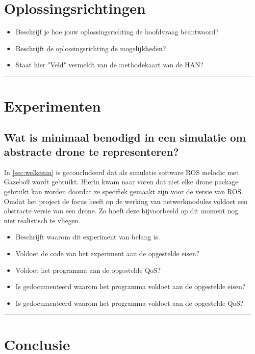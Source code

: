 \documentclass[a4paper, 11pt, oneside]{report}
\begin{document}
\chapter{Oplossingsrichtingen}

\begin{itemize}
\item Beschrijf je hoe jouw oplossingsrichting de hoofdvraag beantwoord?
\item Beschrijft de oplossingsrichting de mogelijkheden?
\item Staat hier "Veld" vermeldt van de methodekaart van de HAN?
\end{itemize}
\hrule

\chapter{Experimenten}
\section{Wat is minimaal benodigd in een simulatie om abstracte drone te representeren?}
\label{sec:dronekeuze}

In \autoref{sec:welkesim} is geconcludeerd dat als simulatie software ROS melodic met Gazebo9 wordt gebruikt.
Hierin kwam naar voren dat niet elke drone package gebruikt kan worden doordat ze specifiek gemaakt zijn voor de versie van ROS.
Omdat het project de focus heeft op de werking van netwerkmodules voldoet een abstracte versie van een drone.
Zo hoeft deze bijvoorbeeld op dit moment nog niet realistisch te vliegen.



\begin{itemize}
\item Beschrijft waarom dit experiment van belang is.
\item Voldoet de code van het experiment aan de opgestelde eisen?
\item Voldoet het programma aan de opgestelde QoS?
\item Is gedocumenteerd waarom het programma voldoet aan de opgestelde eisen?
\item Is gedocumenteerd waarom het programma voldoet aan de opgestelde QoS?
\end{itemize}
\hrule

\chapter{Conclusie}
\end{document}
